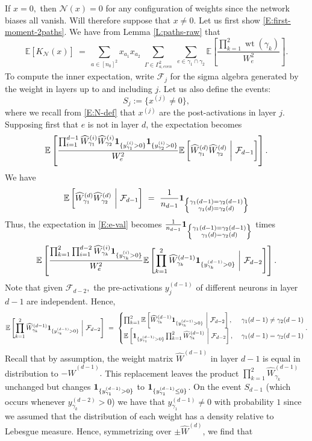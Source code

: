 \documentclass[11pt, reqno]{amsart}
\newcommand{\E}[1]{{\mathbb E}\left [#1\right]}
\newcommand{\set}[1]{\ensuremath{\{#1\}}}
\newcommand{\mN}{\mathcal N}
\newcommand{\mF}{\mathcal F}
\DeclareMathOperator{\wt}{wt}
\begin{document}
If $x=0,$ then $\mathcal N(x)=0$ for any configuration of weights since the network biases all vanish. Will therefore suppose that $x\neq 0.$ Let us first show \eqref{E:first-moment-2paths}. We have from Lemma \ref{L:paths-raw} that
\begin{equation}\label{E:e-val}
\E{K_{\mN}(x)}~=~\sum_{a\in [n_0]^2}x_{a_1}x_{a_2} \sum_{\substack{\Gamma\in \Gamma_{a, even}^2}} \sum_{e\in \gamma_1\cap \gamma_2} \E{\frac{\prod_{k=1}^2 \wt(\gamma_k)}{W_{e}^2}}.
\end{equation}
To compute the inner expectation, write $\mF_{j}$ for the sigma algebra generated by the weight in layers up to and including $j$. Let us also define the events:
\[S_j:=\set{x^{(j)}\neq 0},\]
where we recall from \eqref{E:N-def} that $x^{(j)}$ are the post-activations in layer $j.$ Supposing first that $e$ is not in layer $d$, the expectation becomes
\[\E{\frac{\prod_{i=1}^{d-1} \widehat{W}_{\gamma_1}^{(i)}\widehat{W}_{\gamma_2}^{(i)}{\bf 1}_{\set{y_{\gamma_1}^{(i)}>0}}{\bf 1}_{\set{y_{\gamma_2}^{(i)}>0}}}{W_{e}^2}\E{\widehat{W}_{\gamma_1}^{(d)}\widehat{W}_{\gamma_2}^{(d)}~\bigg|~\mathcal F_{d-1}}}.\]
We have
\[\E{\widehat{W}_{\gamma_1}^{(d)}\widehat{W}_{\gamma_2}^{(d)}~\bigg|~\mathcal F_{d-1}}~=~\frac{1}{n_{d-1}}{\bf 1}_{\left\{\substack{\gamma_1(d-1)=\gamma_2(d-1)\\\gamma_1(d)=\gamma_2(d)}\right\}}\]
Thus, the expectation in \eqref{E:e-val} becomes $\frac{1}{n_{d-1}}{\bf 1}_{\left\{\substack{\gamma_1(d-1)=\gamma_2(d-1)\\\gamma_1(d)=\gamma_2(d)}\right\}}$ times
\[ \E{\frac{\prod_{k=1}^2\prod_{i=1}^{d-2} \widehat{W}_{\gamma_k}^{(i)}{\bf 1}_{\set{y_{\gamma_k}^{(i)}>0}}}{W_{e}^2}\E{\prod_{k=1}^2\widehat{W}_{\gamma_k}^{(d-1)}{\bf 1}_{\set{y_{\gamma_k}^{(d-1)}>0}}~\bigg|~\mathcal F_{d-2}}}.\]
Note that given $\mathcal F_{d-2},$ the pre-activations $y_j^{(d-1)}$ of different neurons in layer $d-1$ are independent. Hence, 
\[
\E{\prod_{k=1}^2\widehat{W}_{\gamma_k}^{(d-1)}{\bf 1}_{\set{y_{\gamma_k}^{(d-1)}>0}}~\bigg|~\mathcal F_{d-2}}~=~\begin{cases}
\prod_{k=1}^2  \E{\widehat{W}_{\gamma_k}^{(d-1)}{\bf 1}_{\set{y_{\gamma_k}^{(d-1)}>0}}~\bigg|~\mathcal F_{d-2}}, &~ \gamma_1(d-1)\neq \gamma_2(d-1)\\
\E{{\bf 1}_{\set{y_{\gamma_1}^{(d-1)}>0}}\prod_{k=1}^2\widehat{W}_{\gamma_k}^{(d-1)}~\bigg|~\mathcal F_{d-2}},&~ \gamma_1(d-1)=\gamma_2(d-1)
\end{cases}.\]
Recall that by assumption, the weight matrix $\widehat{W}^{(d-1)}$ in layer $d-1$ is equal in distribution to $-\widehat{W}^{(d-1)}.$ This replacement leaves the product $\prod_{k=1}^2\widehat{W}_{\gamma_k}^{(d-1)}$ unchanged but changes ${\bf 1}_{\set{y_{\gamma_1}^{(d-1)}>0}}$ to ${\bf 1}_{\set{y_{\gamma_1}^{(d-1)}\leq 0}}$. On the event $S_{d-1}$ (which occurs whenever $y_{\gamma_k}^{(d-2)}>0$) we have that $y_{\gamma_1}^{(d-1)}\neq 0$ with probability $1$ since we assumed that the distribution of each weight has a density relative to Lebesgue measure. Hence, symmetrizing over $\pm\widehat{W}^{(d)}$, we find that
\end{document}
